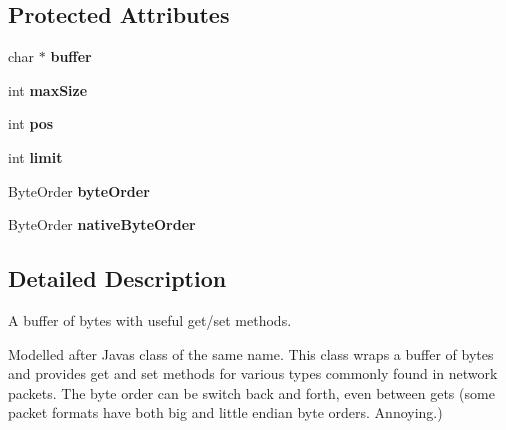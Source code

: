 \subsection*{Protected Attributes}
\begin{DoxyCompactItemize}
\item 
char $\ast$ {\bfseries buffer}\hypertarget{classisat__utils_1_1_byte_buffer_ac5c56d68ba13c03a2440d6ba4738cff3}{}\label{classisat__utils_1_1_byte_buffer_ac5c56d68ba13c03a2440d6ba4738cff3}

\item 
int {\bfseries max\+Size}\hypertarget{classisat__utils_1_1_byte_buffer_a165cc673c8169eaabd88b0c2ce3df2a3}{}\label{classisat__utils_1_1_byte_buffer_a165cc673c8169eaabd88b0c2ce3df2a3}

\item 
int {\bfseries pos}\hypertarget{classisat__utils_1_1_byte_buffer_a42ba2c311d4b680899933035a26421ae}{}\label{classisat__utils_1_1_byte_buffer_a42ba2c311d4b680899933035a26421ae}

\item 
int {\bfseries limit}\hypertarget{classisat__utils_1_1_byte_buffer_a718e92cd1132e3e0562698398bbf016a}{}\label{classisat__utils_1_1_byte_buffer_a718e92cd1132e3e0562698398bbf016a}

\item 
Byte\+Order {\bfseries byte\+Order}\hypertarget{classisat__utils_1_1_byte_buffer_a66654b19b70e006eb7d64a589bc8a842}{}\label{classisat__utils_1_1_byte_buffer_a66654b19b70e006eb7d64a589bc8a842}

\item 
Byte\+Order {\bfseries native\+Byte\+Order}\hypertarget{classisat__utils_1_1_byte_buffer_ab8e39542ef1a07385c62ed6cdc58d4a9}{}\label{classisat__utils_1_1_byte_buffer_ab8e39542ef1a07385c62ed6cdc58d4a9}

\end{DoxyCompactItemize}


\subsection{Detailed Description}
A buffer of bytes with useful get/set methods.

Modelled after Java\textquotesingle{}s class of the same name. This class wraps a buffer of bytes and provides get and set methods for various types commonly found in network packets. The byte order can be switch back and forth, even between gets (some packet formats have both big and little endian byte orders. Annoying.)

